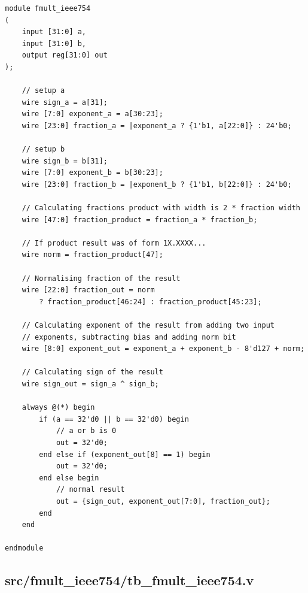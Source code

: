 \documentclass{article}
\begin{document}
\begin{lstlisting}
module fmult_ieee754
(
    input [31:0] a,
    input [31:0] b,
    output reg[31:0] out
);

    // setup a
    wire sign_a = a[31];
    wire [7:0] exponent_a = a[30:23];
    wire [23:0] fraction_a = |exponent_a ? {1'b1, a[22:0]} : 24'b0; 

    // setup b
    wire sign_b = b[31];
    wire [7:0] exponent_b = b[30:23];
    wire [23:0] fraction_b = |exponent_b ? {1'b1, b[22:0]} : 24'b0;

    // Calculating fractions product with width is 2 * fraction width
    wire [47:0] fraction_product = fraction_a * fraction_b;

    // If product result was of form 1X.XXXX...
    wire norm = fraction_product[47];

    // Normalising fraction of the result
    wire [22:0] fraction_out = norm
        ? fraction_product[46:24] : fraction_product[45:23];

    // Calculating exponent of the result from adding two input
    // exponents, subtracting bias and adding norm bit
    wire [8:0] exponent_out = exponent_a + exponent_b - 8'd127 + norm; 

    // Calculating sign of the result
    wire sign_out = sign_a ^ sign_b;

    always @(*) begin
        if (a == 32'd0 || b == 32'd0) begin
            // a or b is 0
            out = 32'd0;
        end else if (exponent_out[8] == 1) begin
            out = 32'd0;
        end else begin
            // normal result
            out = {sign_out, exponent_out[7:0], fraction_out};
        end
    end

endmodule
\end{lstlisting}

\subsection{src/fmult\_ieee754/tb\_fmult\_ieee754.v}
\end{document}
